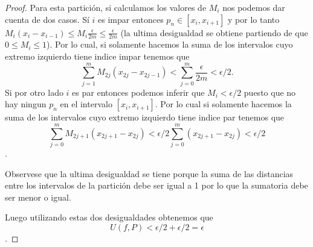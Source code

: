 \documentclass[letter,twoside,12pt]{article}
\begin{document}
\begin{enumerate}
\begin{proof}
Para esta partición, si calculamos los valores de $M_i$ nos podemos dar cuenta de dos casos.
Sí $ i $ es impar entonces $ p_n \in [x_{i},x_{i+1}] $ y por lo tanto $ M_i(x_i-x_{i-1}) \leq M_i \frac{\epsilon}{2m} \leq \frac{\epsilon}{2m}$ (la ultima desigualdad se obtiene partiendo de que $ 0\leq  M_i \leq 1 $).  Por lo cual, si solamente hacemos la suma de los intervalos cuyo extremo izquierdo tiene indice impar tenemos que $$ \sum_{j=1}^{m} M_{2j}(x_{2j}-x_{2j-1}) < \sum_{j=0}^{m} \frac{\epsilon}{2m} < \epsilon/2. $$
Si por otro lado $ i $ es par entonces podemos inferir que $ M_i < \epsilon/2 $ puesto que no hay ningun $p_n$ en el intervalo $[x_{i},x_{i+1}]$. Por lo cual si solamente hacemos la suma de los intervalos cuyo extremo izquierdo tiene indice par tenemos que $$ \sum_{j=0}^{m} M_{2j+1}(x_{2j+1}-x_{2j}) < \epsilon/2 \sum_{j=0}^{m} (x_{2j+1}-x_{2j}) < \epsilon/2 $$.

Observese que la ultima desigualdad se tiene porque la suma de las distancias entre los intervalos de la partición debe ser igual a 1 por lo que la sumatoria debe ser menor o igual.

Luego utilizando estas dos desigualdades obtenemos que $$U(f,P) < \epsilon/2 + \epsilon/2 = \epsilon $$.

\end{proof}
\end{enumerate}
\end{document}
